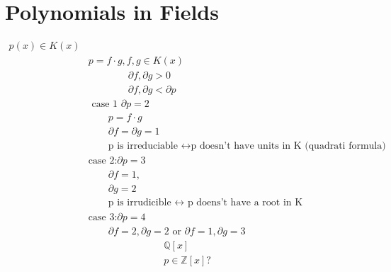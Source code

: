 \documentclass{article}
\begin{document}
\section{Polynomials in Fields}
\begin{align*}
    p(x) \in K(x)& \\ 
    & p = f\cdot g, f, g \in K(x) \\ 
    &\quad \quad \quad  \quad  \partial f, \partial g > 0  \\    
    &\quad \quad\quad  \quad  \partial f, \partial g < \partial p \\    
    &\text{ case 1 }\partial p = 2\\ 
    &\quad\quad  p = f \cdot g \\ 
    & \quad\quad \partial f = \partial g = 1 \\
    &\quad\quad\text{p is irreduciable } \leftrightarrow \text{p doesn't have units in K (quadrati formula)} \\ 
    & \text{case 2:} \partial p = 3 \\ 
    & \quad \quad\partial f = 1, \\ 
    & \quad \quad\partial g = 2  \\ 
    &\quad \quad\text{p is irrudicible } \leftrightarrow \text{ p doens't have a root in K} \\ 
    &\text{case 3:} \partial p = 4 \\ 
    &\quad\quad \partial f = 2, \partial g = 2 \text{ or } \partial f = 1, \partial g = 3
\end{align*}
\begin{align*}
    &\mathbb{Q}[x] \\ 
    &p \in \mathbb{Z}[x] ?
\end{align*}
\end{document}

